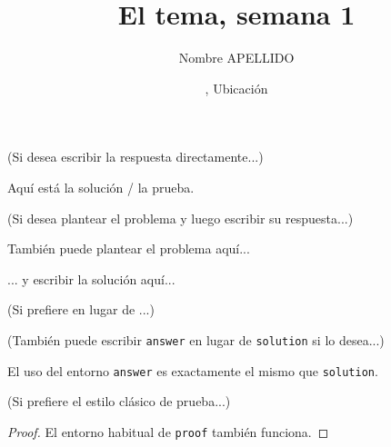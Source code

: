 \documentclass[11pt,
  logo = {example-image},
  title in boldface,
  theorem in new line,
  colored solution,
]{homework}
\title{El tema, semana 1}
\author{Nombre APELLIDO}
\date{\TheDate{2026-01-01}, Ubicación}
\begin{document}
\textcolor{gray!55}{(Si desea escribir la respuesta directamente...)}

\begin{problem}
    Aquí está la solución / la prueba.
\end{problem}


\bigskip\textcolor{gray!55}{(Si desea plantear el problema y luego escribir su respuesta...)}

\begin{problem}
    También puede plantear el problema aquí...
\end{problem}

\begin{solution}
    ... y escribir la solución aquí...
\end{solution}

\bigskip\textcolor{gray!55}{(Si prefiere  en lugar de ...)}



\bigskip\textcolor{gray!55}{(También puede escribir \texttt{answer} en lugar de \texttt{solution} si lo desea...)}

\begin{answer}
    El uso del entorno \verb|answer| es exactamente el mismo que \verb|solution|.
\end{answer}


\bigskip\textcolor{gray!55}{(Si prefiere el estilo clásico de prueba...)}

\begin{proof}
    El entorno habitual de \verb|proof| también funciona.
\end{proof}
\end{document}

